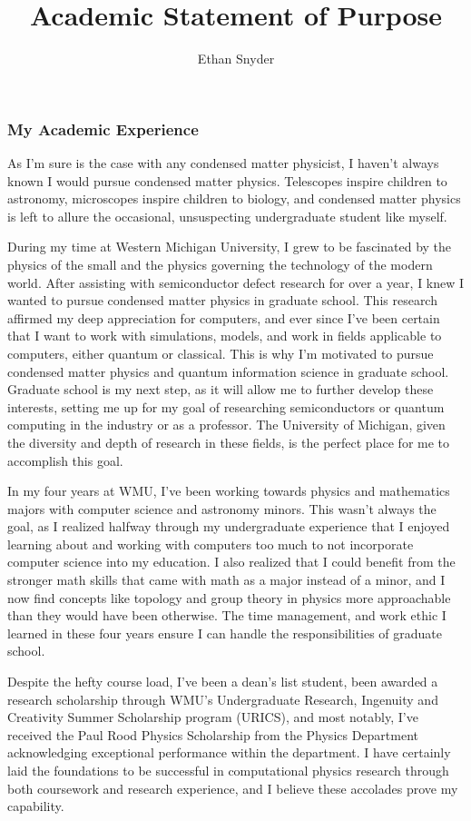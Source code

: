 \documentclass[11pt]{article}
\title{\vspace{-5em}Academic Statement of Purpose\\
	\large \dept{}}
\author{Ethan Snyder}
\date{}
\newcommand{\school}{University of Michigan}
\begin{document}
\maketitle
\subsubsection*{My Academic Experience}
As I'm sure is the case with any condensed matter physicist, I haven't always known I would pursue condensed matter physics. Telescopes inspire children to astronomy, microscopes inspire children to biology, and condensed matter physics is left to allure the occasional, unsuspecting undergraduate student like myself.

During my time at Western Michigan University, I grew to be fascinated by the physics of the small and the physics governing the technology of the modern world. After assisting with semiconductor defect research for over a year, I knew I wanted to pursue condensed matter physics in graduate school. This research affirmed my deep appreciation for computers, and ever since I've been certain that I want to work with simulations, models, and work in fields applicable to computers, either quantum or classical. This is why I'm motivated to pursue condensed matter physics and quantum information science in graduate school. Graduate school is my next step, as it will allow me to further develop these interests, setting me up for my goal of researching semiconductors or quantum computing in the industry or as a professor. The \school{}, given the diversity and depth of research in these fields, is the perfect place for me to accomplish this goal.

In my four years at WMU, I've been working towards physics and mathematics majors with computer science and astronomy minors. This wasn't always the goal, as I realized halfway through my undergraduate experience that I enjoyed learning about and working with computers too much to not incorporate computer science into my education. I also realized that I could benefit from the stronger math skills that came with math as a major instead of a minor, and I now find concepts like topology and group theory in physics more approachable than they would have been otherwise. The time management, and work ethic I learned in these four years ensure I can handle the responsibilities of graduate school.

Despite the hefty course load, I've been a dean's list student, been awarded a research scholarship through WMU's Undergraduate Research, Ingenuity and Creativity Summer Scholarship program (URICS), and most notably, I've received the Paul Rood Physics Scholarship from the Physics Department acknowledging exceptional performance within the department. I have certainly laid the foundations to be successful in computational physics research through both coursework and research experience, and I believe these accolades prove my capability.
\end{document}
